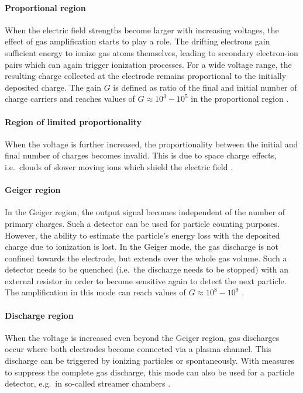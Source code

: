 \paragraph{Proportional region}
When the electric field strengths become larger with increasing voltages, the effect of gas amplification starts to play a role. The drifting electrons gain sufficient energy to ionize gas atoms themselves, leading to secondary electron-ion pairs which can again trigger ionization processes. For a wide voltage range, the resulting charge collected at the electrode remains proportional to the initially deposited charge. The gain $G$ is defined as ratio of the final and initial number of charge carriers and reaches values of $G\approx 10^3-10^5$ in the proportional region \cite{Book-KolanoskiWermes}.
\paragraph{Region of limited proportionality}
When the voltage is further increased, the proportionality between the initial and final number of charges becomes invalid. This is due to space charge effects, i.e.\ clouds of slower moving ions which shield the electric field \cite{Book-KolanoskiWermes}.
\paragraph{Geiger region}
In the Geiger region, the output signal becomes independent of the number of primary charges. Such a detector can be used for particle counting purposes. However, the ability to estimate the particle's energy loss with the deposited charge due to ionization is lost. In the Geiger mode, the gas discharge is not confined towards the electrode, but extends over the whole gas volume. Such a detector needs to be quenched (i.e.\ the discharge needs to be stopped) with an external resistor in order to become sensitive again to detect the next particle. The amplification in this mode can reach values of $G\approx 10^8-10^9$ \cite{Book-KolanoskiWermes}.
\paragraph{Discharge region}
When the voltage is increased even beyond the Geiger region, gas discharges occur where both electrodes become connected via a plasma channel. This discharge can be triggered by ionizing particles or spontaneously. With measures to suppress the complete gas discharge, this mode can also be used for a particle detector, e.g.\ in so-called streamer chambers \cite{Book-KolanoskiWermes}.

